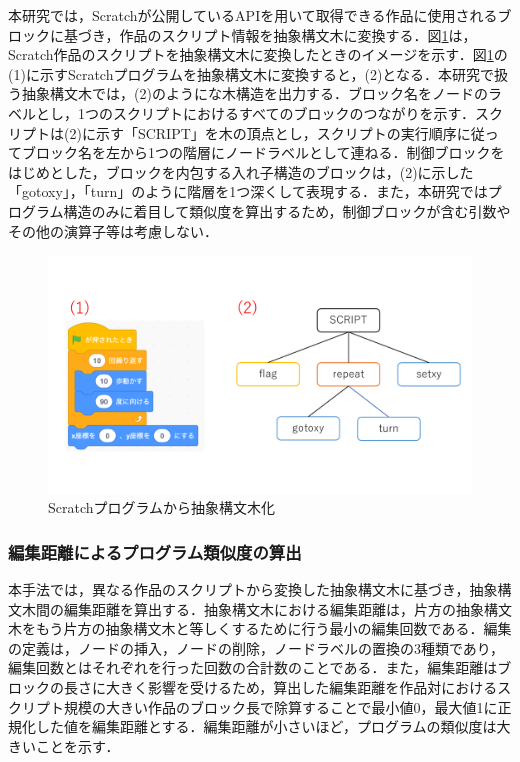 \documentclass[T,J]{fose} %
\begin{document}
本研究では，Scratchが公開しているAPIを用いて取得できる作品に使用されるブロックに基づき，作品のスクリプト情報を抽象構文木に変換する．図\ref{fig:abst}は，Scratch作品のスクリプトを抽象構文木に変換したときのイメージを示す．図\ref{fig:abst}の(1)に示すScratchプログラムを抽象構文木に変換すると，(2)となる．本研究で扱う抽象構文木では，(2)のようにな木構造を出力する．ブロック名をノードのラベルとし，1つのスクリプトにおけるすべてのブロックのつながりを示す．スクリプトは(2)に示す「SCRIPT」を木の頂点とし，スクリプトの実行順序に従ってブロック名を左から1つの階層にノードラベルとして連ねる．制御ブロックをはじめとした，ブロックを内包する入れ子構造のブロックは，(2)に示した「gotoxy」，「turn」のように階層を1つ深くして表現する．また，本研究ではプログラム構造のみに着目して類似度を算出するため，制御ブロックが含む引数やその他の演算子等は考慮しない．
\begin{figure}[t]
	\centering
	\includegraphics[width=1.0\linewidth]{Okamoto_fig/abst.pdf}
	\caption{Scratchプログラムから抽象構文木化}
	\label{fig:abst}
\end{figure}


\subsubsection{編集距離によるプログラム類似度の算出}
本手法では，異なる作品のスクリプトから変換した抽象構文木に基づき，抽象構文木間の編集距離を算出する．抽象構文木における編集距離は，片方の抽象構文木をもう片方の抽象構文木と等しくするために行う最小の編集回数である．編集の定義は，ノードの挿入，ノードの削除，ノードラベルの置換の3種類であり，編集回数とはそれぞれを行った回数の合計数のことである．また，編集距離はブロックの長さに大きく影響を受けるため，算出した編集距離を作品対におけるスクリプト規模の大きい作品のブロック長で除算することで最小値0，最大値1に正規化した値を編集距離とする．編集距離が小さいほど，プログラムの類似度は大きいことを示す．
\end{document}
